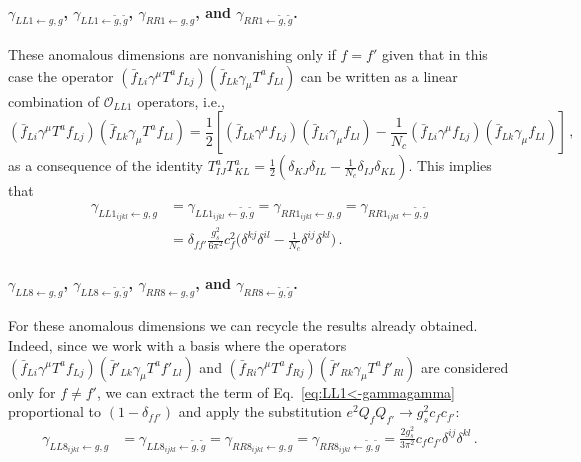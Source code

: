 \paragraph{$\gamma_{LL1\leftarrow g,g}$, $\gamma_{LL1\leftarrow \tilde g, \tilde g}$, $\gamma_{RR1\leftarrow g,g}$, and $\gamma_{RR1\leftarrow \tilde g, \tilde g}$.}
These anomalous dimensions are nonvanishing only if $f = f'$ given that in this case the operator $(\bar f_{Li} \gamma^\mu T^a f_{Lj})(\bar f_{Lk} \gamma_\mu T^a f_{Ll})$ can be written as a linear combination of $\mathcal O_{LL1}$ operators, i.e.,
\begin{equation}
    (\bar f_{Li} \gamma^\mu T^a f_{Lj})(\bar f_{Lk} \gamma_\mu T^a f_{Ll}) = \frac{1}{2}\!\left[(\bar f_{Lk} \gamma^\mu  f_{Lj})(\bar f_{Li} \gamma_\mu f_{Ll})-\frac{1}{N_c}
    (\bar f_{Li} \gamma^\mu  f_{Lj})(\bar f_{Lk} \gamma_\mu f_{Ll})
    \right]\!\,,
\end{equation}
as a consequence of the identity $T^a_{IJ}T^a_{KL} = \frac{1}{2}(\delta_{KJ}\delta_{IL}-\frac{1}{N_c}\delta_{IJ}\delta_{KL})$.
This implies that
\begin{align}
    \gamma_{LL1_{ijkl} \leftarrow g,g } &= 
    \gamma_{LL1_{ijkl} \leftarrow \tilde g, \tilde g} = 
    \gamma_{RR1_{ijkl} \leftarrow g,g } =
    \gamma_{RR1_{ijkl} \leftarrow \tilde g, \tilde g}\nonumber \\
    &= \delta_{ff'}\frac{g_s^2}{6\pi^2}c_f^2 \bigg(
    \delta^{kj}\delta^{il}-\frac{1}{N_c}\delta^{ij}\delta^{kl}
    \bigg)\,.
\end{align}

\paragraph{$\gamma_{LL8\leftarrow g,g}$, $\gamma_{LL8\leftarrow \tilde g, \tilde g}$, $\gamma_{RR8\leftarrow g,g}$, and $\gamma_{RR8\leftarrow \tilde g, \tilde g}$.}
For these anomalous dimensions we can recycle the results already obtained. Indeed, since we work with a basis where the operators $(\bar f_{Li} \gamma^\mu T^a f_{Lj})(\bar f'_{Lk} \gamma_\mu T^a f'_{Ll})$ and $(\bar f_{Ri} \gamma^\mu T^a f_{Rj})(\bar f'_{Rk} \gamma_\mu T^a f'_{Rl})$ are considered only for $f\neq f'$, we can extract the term of Eq.~\eqref{eq:LL1<-gammagamma} proportional to $(1-\delta_{ff'})$ and apply the substitution $e^2 Q_f Q_{f'} \to g_s^2 c_f c_{f'}$:
\begin{align}
    \gamma_{LL8_{ijkl} \leftarrow g,g } &= 
    \gamma_{LL8_{ijkl} \leftarrow \tilde g, \tilde g} = 
    \gamma_{RR8_{ijkl} \leftarrow g,g } =
    \gamma_{RR8_{ijkl} \leftarrow \tilde g, \tilde g}= \frac{2g_s^2}{3\pi^2 } c_f c_{f'}  \delta^{ij} \delta^{kl}\,.
\end{align}

